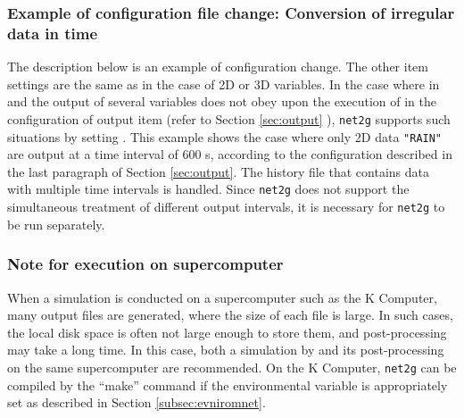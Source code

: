 \subsubsection{Example of configuration file change: Conversion of irregular data in time}
The description below is an example of configuration change. The other item settings are the same as in the case of 2D or 3D variables.
In the case where 
 in  and the output of several variables does not
obey  upon the execution of \scalerm 
in the configuration of output item (refer to Section \ref{sec:output} ),
\verb|net2g| supports such situations by setting .
This example shows the case where only 2D data \verb|"RAIN"| are output at a time interval of 600 s, according to the configuration described in the last paragraph of Section \ref{sec:output}. The history file that contains data with multiple time intervals is handled. Since \verb|net2g| does not support the simultaneous treatment of different output intervals, it is necessary for \verb|net2g| to be run separately.

\subsubsection{Note for execution on supercomputer}
When a simulation is conducted on a supercomputer such as the K Computer, many output files are generated, where the size of each file is large. In such cases, the local disk space is often not large enough to store them,  and post-processing may take a long time. In this case, both a simulation by \scalerm and its post-processing on the same supercomputer are recommended. On the K Computer, \verb|net2g| can be compiled by the ``make'' command  if the environmental variable is appropriately set as described in Section \ref{subsec:evniromnet}.
